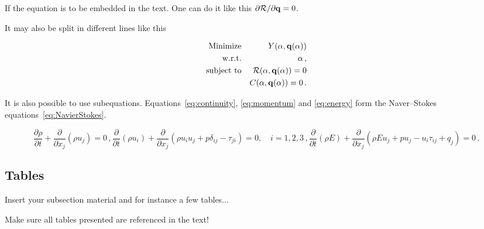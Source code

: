 If the equation is to be embedded in the text. One can do it like this ${\partial {\cal R}}/{\partial {\bf q}}=0$.

It may also be split in different lines like this

\begin{eqnarray}
  {\rm Minimize}   && Y({\bf \alpha},{\bf q}({\bf \alpha}))            \nonumber           \\
  {\rm w.r.t.}     && {\bf \alpha} \,,                                 \label{eq:minimize} \\
  {\rm subject~to} && {\cal R}({\bf \alpha},{\bf q}({\bf \alpha})) = 0 \nonumber           \\
                   &&       C ({\bf \alpha},{\bf q}({\bf \alpha})) = 0 \,. \nonumber
\end{eqnarray}

It is also possible to use subequations. Equations~\ref{eq:continuity}, \ref{eq:momentum} and \ref{eq:energy} form the Naver--Stokes equations~\ref{eq:NavierStokes}.

\begin{subequations}
    \begin{equation}
    \frac{\partial \rho}{\partial t} + \frac{\partial}{\partial x_j}\left( \rho u_j \right) = 0 \,,
    \label{eq:continuity}
    \end{equation}
    \begin{equation}
    \frac{\partial}{\partial t}\left( \rho u_i \right) + \frac{\partial}{\partial x_j} \left( \rho u_i u_j + p \delta_{ij} - \tau_{ji} \right) = 0, \quad i=1,2,3 \,,
    \label{eq:momentum}
    \end{equation}
    \begin{equation}
        \frac{\partial}{\partial t}\left( \rho E \right) + \frac{\partial}{\partial x_j} \left( \rho E u_j + p u_j - u_i \tau_{ij} + q_j \right) = 0 \,.
    \label{eq:energy}
    \end{equation}
\label{eq:NavierStokes}%
\end{subequations}


\subsection{Tables}
\label{section:tables}

Insert your subsection material and for instance a few tables...

Make sure all tables presented are referenced in the text!


